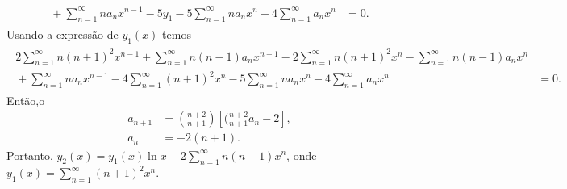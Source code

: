 \documentclass[a4paper,12pt, leqno, answers]{exam}
\begin{document}
\begin{questions}
\begin{solution}
\begin{align*}
\begin{split}
                {}+ \sum_{n = 1}^\infty n a_n x^{n - 1} - 5 y_1 - 5 \sum_{n = 1}^\infty n a_n x^n - 4 \sum_{n = 1}^\infty a_n x^n &= 0.
            \end{split}
        \end{align*}
        Usando a express\~{a}o de $y_1(x)$ temos 
        \begin{align*}
            \begin{split}
                2 \sum_{n = 1}^\infty n (n + 1)^2 x^{n - 1} + \sum_{n = 1}^\infty n (n - 1) a_n x^{n - 1} - 2 \sum_{n = 1}^\infty n (n + 1)^2 x^n - \sum_{n = 1}^\infty n (n - 1) a_n x^n & \\
                {}+ \sum_{n = 1}^\infty n a_n x^{n - 1} - 4 \sum_{n = 1}^\infty (n + 1)^2 x^n - 5 \sum_{n = 1}^\infty n a_n x^n - 4 \sum_{n = 1}^\infty a_n x^n &= 0.
            \end{split}
        \end{align*}
        Ent\~{a}o,o\begin{align*}
            a_{n + 1} &= \left( \frac{n + 2}{n + 1} \right) \left[ (\frac{n + 2}{n + 1} a_n - 2 \right], \\
            a_n &= -2 (n + 1).
        \end{align*}
        Portanto, $y_2(x) = y_1(x) \ln x - 2 \sum_{n = 1}^\infty n (n + 1) x^n$, onde $y_1(x) = \sum_{n = 1}^\infty (n + 1)^2 x^n$.
    \end{solution}


\end{questions}
\end{document}
